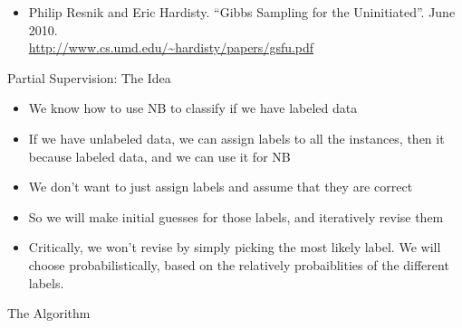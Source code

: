\documentclass[11pt,letterpaper]{article}
\begin{document}
\begin{itemize}
  \item Philip Resnik and Eric Hardisty.  ``Gibbs Sampling for the Uninitiated''.  June 2010.\\  \url{http://www.cs.umd.edu/~hardisty/papers/gsfu.pdf}
\end{itemize}


Partial Supervision: The Idea

\begin{itemize}
  \item We know how to use NB to classify if we have labeled data
  \item If we have unlabeled data, we can assign labels to all the instances, then it because labeled data, and we can use it for NB
  \item We don't want to just assign labels and assume that they are correct
  \item So we will make initial guesses for those labels, and iteratively revise them
  \item Critically, we won't revise by simply picking the most likely label.  We will choose probabilistically, based on the relatively probaiblities of the different labels.
\end{itemize}


The Algorithm
\end{document}

